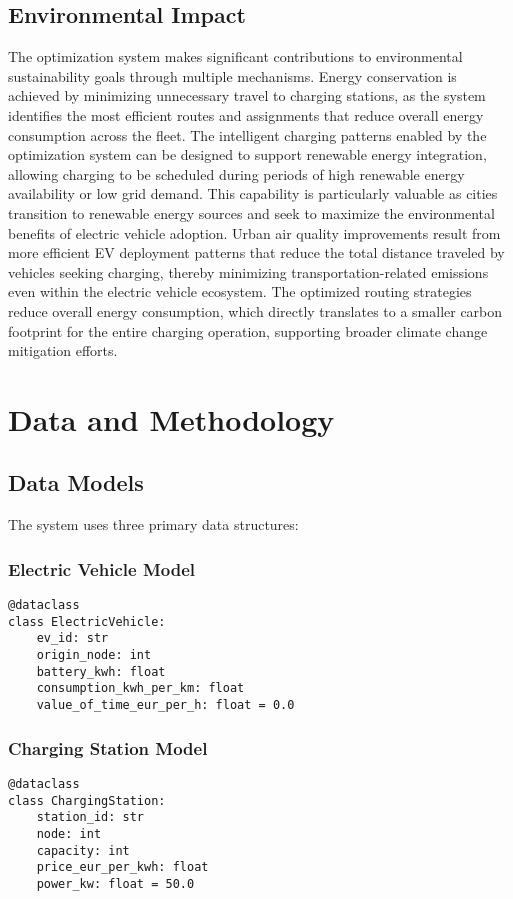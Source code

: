 \documentclass[12pt,a4paper]{article}
\begin{document}
\subsection{Environmental Impact}

The optimization system makes significant contributions to environmental sustainability goals through multiple mechanisms. Energy conservation is achieved by minimizing unnecessary travel to charging stations, as the system identifies the most efficient routes and assignments that reduce overall energy consumption across the fleet. The intelligent charging patterns enabled by the optimization system can be designed to support renewable energy integration, allowing charging to be scheduled during periods of high renewable energy availability or low grid demand. This capability is particularly valuable as cities transition to renewable energy sources and seek to maximize the environmental benefits of electric vehicle adoption. Urban air quality improvements result from more efficient EV deployment patterns that reduce the total distance traveled by vehicles seeking charging, thereby minimizing transportation-related emissions even within the electric vehicle ecosystem. The optimized routing strategies reduce overall energy consumption, which directly translates to a smaller carbon footprint for the entire charging operation, supporting broader climate change mitigation efforts.

\section{Data and Methodology}

\subsection{Data Models}

The system uses three primary data structures:

\subsubsection{Electric Vehicle Model}
\begin{lstlisting}[caption=Electric Vehicle Data Structure]
@dataclass
class ElectricVehicle:
    ev_id: str
    origin_node: int
    battery_kwh: float
    consumption_kwh_per_km: float
    value_of_time_eur_per_h: float = 0.0
\end{lstlisting}

\subsubsection{Charging Station Model}
\begin{lstlisting}[caption=Charging Station Data Structure]
@dataclass
class ChargingStation:
    station_id: str
    node: int
    capacity: int
    price_eur_per_kwh: float
    power_kw: float = 50.0
\end{lstlisting}
\end{document}
